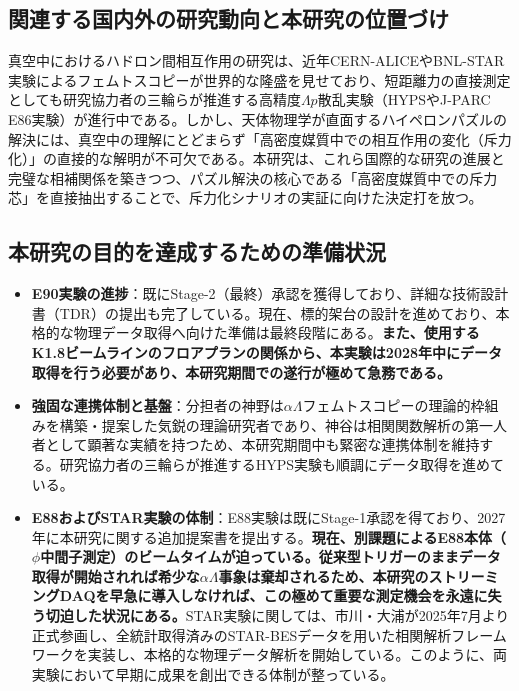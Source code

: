 \documentclass[11pt,a4j,dvipdfmx]{jarticle} 					%
\newcommand{\研究課題名}{加速器実験による短距離バリオン間相互作用の解明と中性子星ハイペロンパズルの解決}
\newcommand{\研究機関名}{東北大学}
\newcommand{\研究代表者氏名}{市川裕大}
\newcommand{\研究期間の最終元号年度}{13}
\begin{document}
\subsection{関連する国内外の研究動向と本研究の位置づけ}
真空中におけるハドロン間相互作用の研究は、近年CERN-ALICEやBNL-STAR実験によるフェムトスコピーが世界的な隆盛を見せており、短距離力の直接測定としても研究協力者の三輪らが推進する高精度$\Lambda p$散乱実験（HYPSやJ-PARC E86実験）が進行中である。しかし、天体物理学が直面するハイペロンパズルの解決には、真空中の理解にとどまらず「高密度媒質中での相互作用の変化（斥力化）」の直接的な解明が不可欠である。本研究は、これら国際的な研究の進展と完璧な相補関係を築きつつ、パズル解決の核心である「高密度媒質中での斥力芯」を直接抽出することで、斥力化シナリオの実証に向けた決定打を放つ。

\subsection{本研究の目的を達成するための準備状況}

\begin{itemize}
    \item \textbf{E90実験の進捗}：既にStage-2（最終）承認を獲得しており、詳細な技術設計書（TDR）の提出も完了している。現在、標的架台の設計を進めており、本格的な物理データ取得へ向けた準備は最終段階にある。\textbf{また、使用するK1.8ビームラインのフロアプランの関係から、本実験は2028年中にデータ取得を行う必要があり、本研究期間での遂行が極めて急務である。}
    \item \textbf{強固な連携体制と基盤}：分担者の神野は$\alpha\Lambda$フェムトスコピーの理論的枠組みを構築・提案した気鋭の理論研究者であり、神谷は相関関数解析の第一人者として顕著な実績を持つため、本研究期間中も緊密な連携体制を維持する。研究協力者の三輪らが推進するHYPS実験も順調にデータ取得を進めている。
    \item \textbf{E88およびSTAR実験の体制}：E88実験は既にStage-1承認を得ており、2027年に本研究に関する追加提案書を提出する。\textbf{現在、別課題によるE88本体（$\phi$中間子測定）のビームタイムが迫っている。従来型トリガーのままデータ取得が開始されれば希少な$\alpha\Lambda$事象は棄却されるため、本研究のストリーミングDAQを早急に導入しなければ、この極めて重要な測定機会を永遠に失う切迫した状況にある。}STAR実験に関しては、市川・大浦が2025年7月より正式参画し、全統計取得済みのSTAR-BESデータを用いた相関解析フレームワークを実装し、本格的な物理データ解析を開始している。このように、両実験において早期に成果を創出できる体制が整っている。
\end{itemize}
\end{document}
